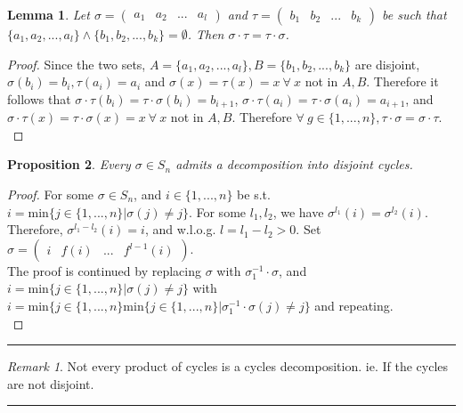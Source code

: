\documentclass{article}
\newtheorem{theorem}{Proposition}[section]
\newtheorem{lemma}[theorem]{Lemma}
\theoremstyle{definition}
\theoremstyle{remark}
\newtheorem*{remark}{Remark}
\begin{document}
\begin{lemma}
Let $\sigma=\begin{pmatrix}
a_1&a_2&...&a_l
\end{pmatrix}$
and $\tau = \begin{pmatrix}
b_1&b_2&...&b_k
\end{pmatrix}$ be such that $\lbrace a_1,a_2,...,a_l\rbrace \wedge \lbrace b_1,b_2,...,b_k\rbrace = \emptyset$. Then $\sigma\cdot \tau=\tau\cdot\sigma$.\\
\end{lemma}
\begin{proof}
Since the two sets, $A=\lbrace a_1,a_2,...,a_l\rbrace,B=\lbrace b_1,b_2,...,b_k\rbrace$ are disjoint, $\sigma(b_i)=b_i,\tau(a_i)=a_i$ and $\sigma(x)=\tau(x)=x~\forall~x$ not in $A,B$. Therefore it follows that $\sigma\cdot\tau(b_i)=\tau\cdot\sigma(b_i)=b_{i+1}$, $\sigma\cdot\tau(a_i)=\tau\cdot\sigma(a_i)=a_{i+1}$, and $\sigma\cdot\tau(x)=\tau\cdot\sigma(x)=x~\forall~x$ not in $A,B$. Therefore $\forall ~ g\in \lbrace 1,...,n\rbrace,\tau\cdot\sigma=\sigma\cdot\tau$.\\
\end{proof}

\begin{theorem}
Every $\sigma \in S_n$ admits a decomposition into disjoint cycles.
\end{theorem}
\begin{proof}
For some $\sigma\in S_n$, and $i\in\lbrace1,...,n\rbrace$ be s.t. $i=\mathrm{min}\lbrace j\in\lbrace1,...,n\rbrace|\sigma(j)\neq j\rbrace$. For some $l_1,l_2$, we have $\sigma^{l_1}(i)=\sigma^{l_2}(i)$. Therefore, $\sigma^{l_1-l_2}(i)=i$, and w.l.o.g. $l=l_1-l_2>0$. Set $\sigma=\begin{pmatrix}
i&f(i)&...&f^{l-1}(i)
\end{pmatrix}$.\\
The proof is continued by replacing $\sigma$ with $\sigma_1^{-1}\cdot\sigma$, and $i=\mathrm{min}\lbrace j \in\lbrace1,...,n\rbrace| \sigma(j)\neq j\rbrace$ with $i=\mathrm{min}\lbrace j\in \lbrace1,...,n\rbrace\mathrm{min}\lbrace j \in\lbrace1,...,n\rbrace|\sigma_1^{-1}\cdot\sigma(j)\neq j\rbrace$ and repeating.\\
\end{proof}
\hrule 
\vspace{2mm}
\begin{remark}
Not every product of cycles is a cycles decomposition. ie. If the cycles are not disjoint.\\
\end{remark}
\hrule
\newpage
\end{document}
